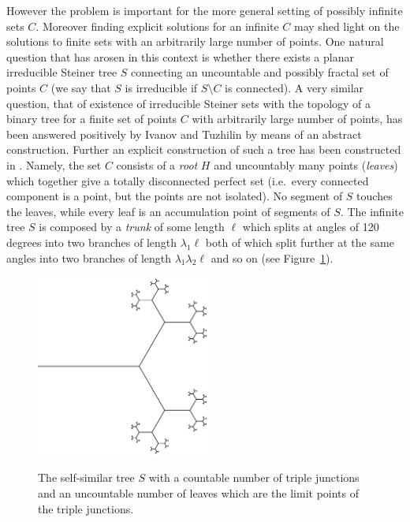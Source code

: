 \documentclass{amsart}
\theoremstyle{definition}
\theoremstyle{remark}
\begin{document}
However the problem is important for the more general setting of possibly infinite 
sets $C$. 
Moreover finding explicit solutions for an infinite $C$ may shed light on 
the solutions to finite sets with an arbitrarily large number of points.
One natural question that has arosen in this context is 
whether there exists a planar irreducible Steiner tree $S$ connecting an uncountable 
and possibly fractal set of points $C$ 
(we say that $S$ is irreducible if $S\setminus C$ is 
connected).
A very similar question,
that of existence of irreducible Steiner sets with the topology 
of a binary tree for a finite set of points $C$ with arbitrarily 
large number of points, has been answered positively by Ivanov and 
Tuzhilin \cite{IvaTuz94} by means of an abstract construction.
Further an explicit construction of such a tree has been constructed 
in \cite{PaoSteTep15}.
Namely, the set $C$ consists of a \emph{root} $H$ and uncountably many
points (\emph{leaves}) which together give a totally disconnected perfect set 
(i.e.\ every connected component is a point, but the points are not isolated).
No segment of $S$
touches the leaves, while every leaf is an accumulation point of
segments of $S$.
The infinite tree $S$ 
is composed by a \emph{trunk} of
some length $\ell$ which splits at angles of 120 degrees 
into two branches of length $\lambda_1 \ell$ 
both of which split further at the same angles into two branches of length
$\lambda_1\lambda_2\ell$ and so on (see Figure~\ref{fig:tree}).
\begin{figure}
  \centering 
  \includegraphics[height=6cm]{tree.pdf}
  \label{fig:tree}
  \caption{The self-similar tree $S$ with a countable 
  number of triple junctions and an uncountable number 
  of leaves which are the limit points of the triple 
  junctions.}
\end{figure}
\end{document}
